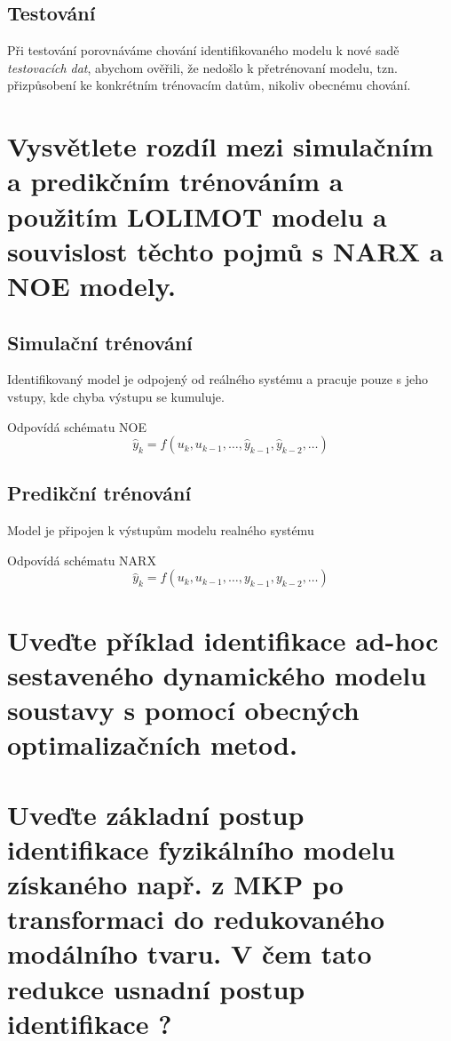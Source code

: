 \documentclass{article}
\begin{document}
	\subsection*{Testování}
	Při testování porovnáváme chování identifikovaného modelu k nové sadě \emph{testovacích dat}, abychom ověřili, že nedošlo k přetrénovaní modelu, tzn. přizpůsobení ke konkrétním trénovacím datům, nikoliv obecnému chování.

	\section{Vysvětlete rozdíl mezi simulačním a predikčním trénováním a použitím LOLIMOT modelu a souvislost těchto pojmů s NARX a NOE modely. }

	\subsection*{Simulační trénování}
	Identifikovaný model je odpojený od reálného systému a pracuje pouze s jeho vstupy, kde chyba výstupu se kumuluje.

	Odpovídá schématu NOE
	\begin{equation}
		\hat{y}_k = f(u_k,u_{k-1},\dots,\hat{y}_{k-1},\hat{y}_{k-2},\dots)
	\end{equation}

	\subsection*{Predikční trénování}
	Model je připojen k výstupům modelu realného systému

	Odpovídá schématu NARX
	\begin{equation}
		\hat{y}_k = f(u_k,u_{k-1},\dots,y_{k-1},y_{k-2},\dots)
	\end{equation}

	\section{Uveďte příklad identifikace ad-hoc sestaveného dynamického modelu soustavy s pomocí obecných optimalizačních metod. }

	\section{Uveďte základní postup identifikace fyzikálního modelu získaného např. z MKP po transformaci do redukovaného modálního tvaru. V čem tato redukce usnadní postup identifikace ? }
	
\end{document}
